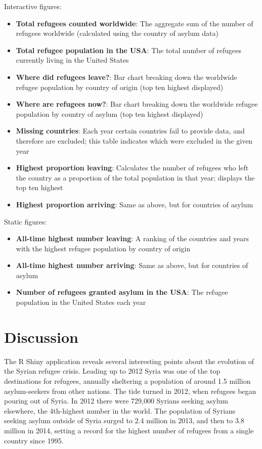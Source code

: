 \documentclass{article}
\begin{document}
\noindent Interactive figures:
\begin{itemize}
\item \textbf{Total refugees counted worldwide}: The aggregate sum of the number of refugees worldwide (calculated using the country of asylum data)
\item \textbf{Total refugee population in the USA}: The total number of refugees currently living in the United States
\item \textbf{Where did refugees leave?}: Bar chart breaking down the worldwide refugee population by country of origin (top ten highest displayed)
\item \textbf{Where are refugees now?}: Bar chart breaking down the worldwide refugee population by country of asylum (top ten highest displayed)
\item \textbf{Missing countries}: Each year certain countries fail to provide data, and therefore are excluded; this table indicates which were excluded in the given year
\item \textbf{Highest proportion leaving}: Calculates the number of refugees who left the country as a proportion of the total population in that year; displays the top ten highest
\item \textbf{Highest proportion arriving}: Same as above, but for countries of asylum
\end{itemize}
\noindent Static figures:
\begin{itemize}
\item \textbf{All-time highest number leaving}: A ranking of the countries and years with the highest refugee population by country of origin
\item \textbf{All-time highest number arriving}: Same as above, but for countries of asylum
\item \textbf{Number of refugees granted asylum in the USA}: The refugee population in the United States each year
\end{itemize}

\section{Discussion}

\noindent The R Shiny application reveals several interesting points about the evolution of the Syrian refugee crisis. Leading up to 2012 Syria was one of the top destinations for refugees, annually sheltering a population of around 1.5 million asylum-seekers from other nations. The tide turned in 2012, when refugees began pouring out of Syria. In 2012 there were 729,000 Syrians seeking asylum elsewhere, the 4th-highest number in the world. The population of Syrians seeking asylum outside of Syria surged to 2.4 million in 2013, and then to 3.8 million in 2014, setting a record for the highest number of refugees from a single country since 1995.\vspace{2mm}
\end{document}
